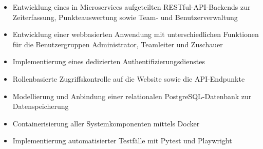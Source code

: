 \begin{itemize}
      \item Entwicklung eines in Microservices aufgeteilten RESTful-\gls{API}-Backends zur Zeiterfassung, Punkteauswertung sowie Team- und Benutzerverwaltung
      \item Entwicklung einer webbasierten Anwendung mit unterschiedlichen Funktionen für die Benutzergruppen Administrator, Teamleiter und Zuschauer
      \item Implementierung eines dedizierten Authentifizierungsdienstes
      \item Rollenbasierte Zugriffskontrolle auf die Website sowie die \gls{API}-Endpunkte
      \item Modellierung und Anbindung einer relationalen PostgreSQL-Datenbank zur Datenspeicherung
      \item Containerisierung aller Systemkomponenten mittels Docker
      \item Implementierung automatisierter Testfälle mit Pytest und Playwright
\end{itemize}
